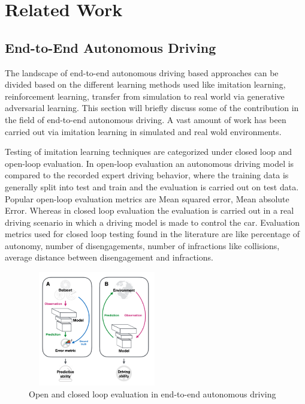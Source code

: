 

    \chapter{Related Work}


    \section{End-to-End Autonomous Driving}
    The landscape of end-to-end autonomous driving based approaches can be divided based on the different learning methods used like imitation learning, reinforcement learning, transfer from simulation to real world via generative adversarial learning.
This section will briefly discuss some of the contribution in the field of end-to-end autonomous driving. A vast amount of work has been carried out via imitation learning in simulated and real wold environments. 
\par Testing of imitation learning techniques are categorized under closed loop and open-loop evaluation. In open-loop evaluation an autonomous driving model is compared to the recorded expert driving behavior, where the training data is generally split into test and train and the evaluation is carried out on test data. Popular open-loop evaluation metrics are Mean squared error, Mean absolute Error. Whereas in closed loop evaluation the evaluation is carried out in a real driving scenario in which a driving model is made to control the car. Evaluation metrics used for closed loop testing found in the literature are like percentage of autonomy, number of disengagements, number of infractions like collisions, average distance between disengagement and infractions.

 \begin{figure}[h]
    \centering
    \includegraphics[width=6cm, height=5cm]{images/open_closed.png}
    \caption{Open and closed loop evaluation in end-to-end autonomous driving \cite{DBLP:journals/corr/abs-2003-06404}}
    \end{figure}

